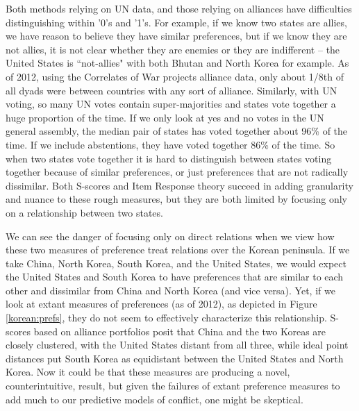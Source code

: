Both methods relying on UN data, and those relying on alliances have difficulties distinguishing within '0's and '1's. For example, if we know two states are allies, we have reason to believe they have similar preferences, but if we know they are not allies, it is not clear whether they are enemies or they are indifferent -- the United States is ``not-allies" with both Bhutan and North Korea for example. As of 2012, using the Correlates of War projects alliance data, only about 1/8th of all dyads were between countries with any sort of alliance. Similarly, with UN voting, so many UN votes contain super-majorities and states vote together a huge proportion of the time. If we only look at yes and no votes in the UN general assembly, the median pair of states has voted together about 96\% of the time. If we include abstentions,  they have voted together 86\% of the time. So when two states vote together it is hard to distinguish between states voting together because of similar preferences, or just preferences that are not radically dissimilar. Both S-scores and Item Response theory succeed in adding granularity and nuance to these rough measures, but they are both limited by focusing only on a relationship between two states. 

We can see the danger of focusing only on direct relations when we view how these two measures of preference treat relations over the Korean peninsula. If we take China, North Korea, South Korea, and the United States, we would expect the United States and South Korea to have preferences that are similar to each other and dissimilar from China and North Korea (and vice versa). Yet, if we look at extant measures of preferences (as of 2012), as depicted in Figure \ref{korean:prefs}, they do not seem to effectively characterize this relationship. S-scores based on alliance portfolios posit that China and the two Koreas are closely clustered, with the United States distant from all three, while ideal point distances put South Korea as equidistant between the United States and North Korea. Now it could be that these measures are producing a novel, counterintuitive, result, but given the failures of extant preference measures to add much to our predictive models of conflict, one might be skeptical.

